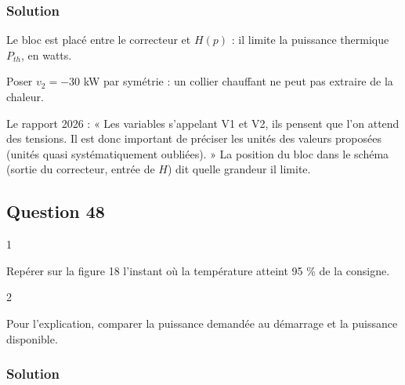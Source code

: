 \documentclass[11pt,a4paper]{article}
\newcommand{\equationajustee}[1]{%
  \sbox{\boiteequation}{$\displaystyle #1$}%
  \ifdim\wd\boiteequation>\linewidth
    \[\resizebox{\linewidth}{!}{\usebox{\boiteequation}}\]%
  \else
    \[#1\]%
  \fi}
\begin{document}
\hypertarget{solution-46}{%
\subsubsection{Solution}\label{solution-46}}

Le bloc est placé entre le correcteur et \(H(p)\) : il limite la puissance thermique \(P_{th}\), en watts.

\equationajustee{\boxed{v_1=30\,000\ \text{W}}}

\equationajustee{\boxed{v_2=0\ \text{W}}}

\begin{piege}

Poser \(v_2=-30\) kW par symétrie : un collier chauffant ne peut pas extraire de la chaleur.

\end{piege}

\begin{jury}

Le rapport 2026 : « Les variables s'appelant V1 et V2, ils pensent que l'on attend des tensions. Il est donc important de préciser les unités des valeurs proposées (unités quasi systématiquement oubliées). » La position du bloc dans le schéma (sortie du correcteur, entrée de \(H\)) dit quelle grandeur il limite.

\end{jury}

\hypertarget{question-48}{%
\subsection{Question 48}\label{question-48}}

\begin{indication}{1}

Repérer sur la figure 18 l'instant où la température atteint 95 \% de la consigne.

\end{indication}

\begin{indication}{2}

Pour l'explication, comparer la puissance demandée au démarrage et la puissance disponible.

\end{indication}

\hypertarget{solution-47}{%
\subsubsection{Solution}\label{solution-47}}
\end{document}
